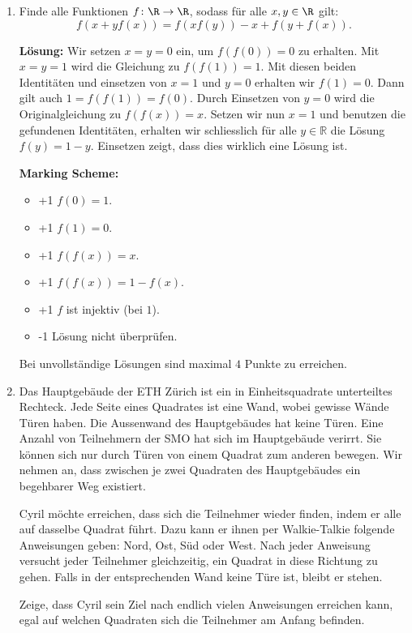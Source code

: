\documentclass[language=german,style=solution]{smo}
\begin{document}
\begin{enumerate}[label=\textbf{\arabic*.}]
\item
Finde alle Funktionen $f\colon\R \to\R$, sodass für alle $x,y \in \R$ gilt:
\[
	f(x+yf(x)) = f(xf(y)) - x + f(y+f(x)).
\]

\textbf{Lösung:} Wir setzen $x=y=0$ ein, um $f(f(0)) = 0$ zu erhalten. Mit $x=y=1$ wird die Gleichung zu $f(f(1)) = 1$. Mit diesen beiden Identitäten und einsetzen von $x=1$ und $y=0$ erhalten wir $f(1) = 0$. Dann gilt auch $1 = f(f(1)) = f(0)$. Durch Einsetzen von $y=0$ wird die Originalgleichung zu $f(f(x)) = x$. Setzen wir nun $x=1$ und benutzen die gefundenen Identitäten, erhalten wir schliesslich für alle $y \in \mathbb{R}$ die Lösung $f(y) = 1-y$. Einsetzen zeigt, dass dies wirklich eine Lösung ist.

\textbf{Marking Scheme:}
\begin{itemize}
	\item +1 $f(0) = 1$.
	\item +1 $f(1) = 0$.
	\item +1 $f(f(x)) = x$.
	\item +1 $f(f(x)) = 1-f(x)$.
	\item +1 $f$ ist injektiv (bei $1$).
	\item -1 Lösung nicht überprüfen.
\end{itemize}
Bei unvollständige Lösungen sind maximal $4$ Punkte zu erreichen.


\newpage

\item
Das Hauptgebäude der ETH Zürich ist ein in Einheitsquadrate unterteiltes Rechteck. Jede Seite eines Quadrates ist eine Wand, wobei gewisse Wände Türen haben. Die Aussenwand des Hauptgebäudes hat keine Türen. Eine Anzahl von Teilnehmern der SMO hat sich im Hauptgebäude verirrt. Sie können sich nur durch Türen von einem Quadrat zum anderen bewegen. Wir nehmen an, dass zwischen je zwei Quadraten des Hauptgebäudes ein begehbarer Weg existiert.

Cyril möchte erreichen, dass sich die Teilnehmer wieder finden, indem er alle auf dasselbe Quadrat führt. Dazu kann er ihnen per Walkie-Talkie folgende Anweisungen geben: Nord, Ost, Süd oder West. Nach jeder Anweisung versucht jeder Teilnehmer gleichzeitig, ein Quadrat in diese Richtung zu gehen. Falls in der entsprechenden Wand keine Türe ist, bleibt er stehen.

Zeige, dass Cyril sein Ziel nach endlich vielen Anweisungen erreichen kann, egal auf welchen Quadraten sich die Teilnehmer am Anfang befinden.


\end{enumerate}
\end{document}
